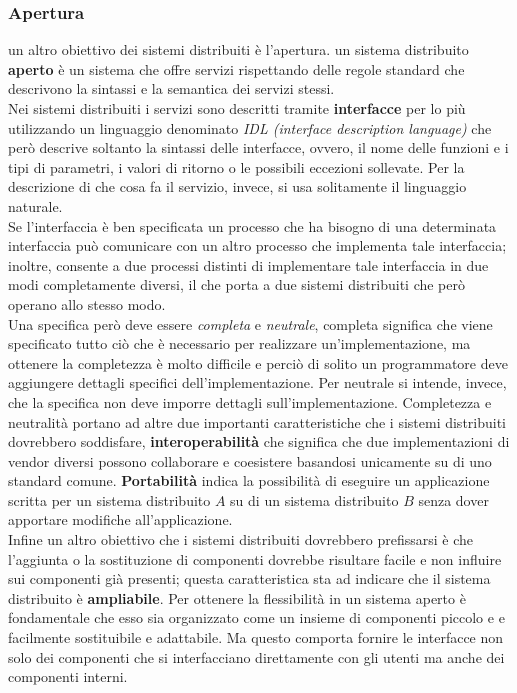 \subsubsection{Apertura}
un altro obiettivo dei sistemi distribuiti è l'apertura. un sistema distribuito \textbf{aperto} è un sistema che offre servizi rispettando delle regole standard che descrivono la sintassi e la semantica dei servizi stessi.\\
Nei sistemi distribuiti i servizi sono descritti tramite \textbf{interfacce} per lo più utilizzando un linguaggio denominato \emph{IDL (interface description language)} che però descrive soltanto la sintassi delle interfacce, ovvero, il nome delle funzioni e i tipi di parametri, i valori di ritorno o le possibili eccezioni sollevate. Per la descrizione di che cosa fa il servizio, invece, si usa solitamente il linguaggio naturale.\\
Se l'interfaccia è ben specificata un processo che ha bisogno di una determinata interfaccia può comunicare con un altro processo che implementa tale interfaccia; inoltre, consente a due processi distinti di implementare tale interfaccia in due modi completamente diversi, il che porta a due sistemi distribuiti che però  operano allo stesso modo.\\
Una specifica però deve essere \emph{completa} e \emph{neutrale}, completa significa che viene specificato tutto ciò che è necessario per realizzare un'implementazione, ma ottenere la completezza è molto difficile e perciò di solito un programmatore deve aggiungere dettagli specifici dell'implementazione. Per neutrale si intende, invece, che la specifica non deve imporre dettagli sull'implementazione. Completezza e neutralità portano ad altre due importanti caratteristiche che i sistemi distribuiti dovrebbero soddisfare, \textbf{interoperabilità} che significa che due implementazioni di vendor diversi possono collaborare e coesistere basandosi unicamente su di uno standard comune. \textbf{Portabilità} indica la possibilità di eseguire un applicazione scritta per un sistema distribuito $A$ su di un sistema distribuito $B$ senza dover apportare modifiche all'applicazione.\\
Infine un altro obiettivo che i sistemi distribuiti dovrebbero prefissarsi è che l'aggiunta o la sostituzione di componenti dovrebbe risultare facile e non influire sui componenti già presenti; questa caratteristica sta ad indicare che il sistema distribuito è \textbf{ampliabile}.
Per ottenere la flessibilità in un sistema aperto è fondamentale che esso sia organizzato come un insieme di componenti piccolo e e facilmente sostituibile e adattabile. Ma questo comporta fornire le interfacce non solo dei componenti che si interfacciano direttamente con gli utenti ma anche dei componenti interni.

